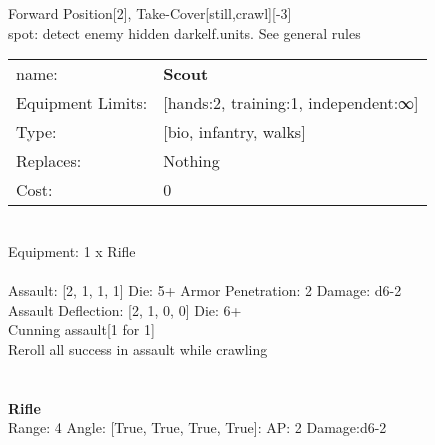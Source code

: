 \noindent Forward Position[2], Take-Cover[still,crawl][-3]\\ 
spot: detect enemy hidden darkelf.units. See general rules\\ 


\noindent
\begin{tabular}{ll}
name: &{\bf Scout } \\
Equipment Limits: &[hands:2, training:1, independent:∞] \\
Type: &[bio, infantry, walks] \\
Replaces: &Nothing \\
Cost: & 0\\
\end{tabular}
\ \\
Equipment: 1 x Rifle \\
\ \\
Assault: [2, 1, 1, 1] Die: 5+ Armor Penetration: 2 Damage: d6-2 \\
Assault Deflection: [2, 1, 0, 0] Die: 6+\\
\indent Cunning assault[1 for 1]\\ 
Reroll all success in assault while crawling\\ 
 
\ \\

\ \\
{\bf Rifle } \\



Range: 4  Angle: [True, True, True, True]: AP: 2 Damage:d6-2 \\




 
\ \\



